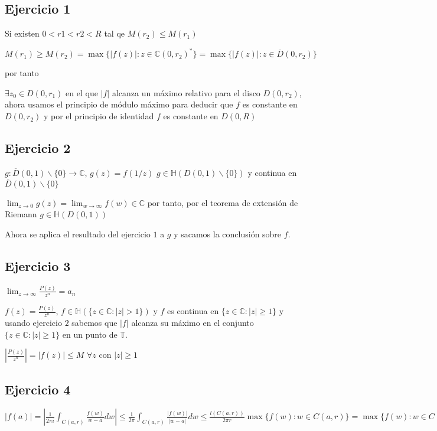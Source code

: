 \subsection{Ejercicio 1}

Si existen $0<r1<r2<R$ tal qe $M(r_2) \leq M(r_1)$

$M(r_1) \geq M(r_2) = \max\{ |f(z)| : z\in\mathbb{C}(0,r_2)^{\ast} \} = \max\{ |f(z)| : z\in\overline{D}(0,r_2) \}$

por tanto

$\exists z_0 \in D(0,r_1)$ en el que $|f|$ alcanza un máximo relativo para el disco $D(0,r_2)$,
ahora usamos el principio de módulo máximo para deducir que 
$f$ es constante en $D(0,r_2)$ y por el principio de identidad
$f$ es constante en $D(0,R)$


\subsection{Ejercicio 2}
$g:\overline{D}(0,1)\backslash\{0\} \rightarrow \mathbb{C}$, $g(z) = f(1/z)$ 
$g\in\mathbb{H}(D(0,1)\backslash\{0\})$ y continua en $\overline{D}(0,1)\backslash\{0\}$

$\lim_{z\rightarrow0} g(z) = \lim_{w\rightarrow\infty} f(w) \in\mathbb{C}$ por tanto, por el teorema de extensión de Riemann
$g\in\mathbb{H}(D(0,1))$

Ahora se aplica el resultado del ejercicio $1$ a $g$ y sacamos la conclusión sobre $f$.


\subsection{Ejercicio 3}
$\lim_{z\rightarrow\infty} \frac{P(z)}{z^n} = a_n$

$f(z) = \frac{P(z)}{z^n}$, $f\in\mathbb{H}(\{ z\in\mathbb{C} : |z|>1 \})$ y $f$ es continua en $\{ z\in\mathbb{C} : |z|\geq 1 \}$
y usando ejercicio $2$ sabemos que
$|f|$ alcanza su máximo en el conjunto $\{ z\in\mathbb{C} : |z|\geq 1 \}$ en un punto de $\mathbb{T}$.

$\left| \frac{P(z)}{z^n} \right| = |f(z)| \leq M$ $\forall z$ con $|z|\geq 1$


\subsection{Ejercicio 4}
$|f(a)| = \left| \frac{1}{2\pi i}\int_{C(a,r)} \frac{f(w)}{w-a} dw \right| \leq \frac{1}{2\pi} \int_{C(a,r)} \frac{|f(w)|}{|w-a|} dw \leq \frac{l(C(a,r))}{2\pi r} \max\{ f(w) : w\in C(a,r) \} = \max\{ f(w) : w\in C(a,r) \} $

